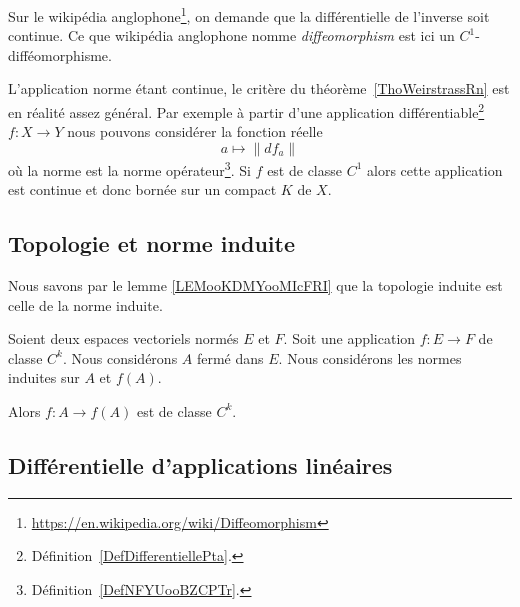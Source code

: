 \begin{normaltext}
	Sur le wikipédia anglophone\footnote{\url{https://en.wikipedia.org/wiki/Diffeomorphism}}, on demande que la différentielle de l'inverse soit continue. Ce que wikipédia anglophone nomme \emph{diffeomorphism} est ici un \( C^1\)-difféomorphisme.
\end{normaltext}

\begin{remark}      \label{RemATQVooDnZBbs}
	L'application norme étant continue, le critère du théorème~\ref{ThoWeirstrassRn} est en réalité assez général. Par exemple à partir d'une application différentiable\footnote{Définition~\ref{DefDifferentiellePta}.} \( f\colon X\to Y\)  nous pouvons considérer la fonction réelle
	\begin{equation}
		a\mapsto \|  df_a   \|
	\end{equation}
	où la norme est la norme opérateur\footnote{Définition~\ref{DefNFYUooBZCPTr}.}. Si \( f\) est de classe \( C^1\) alors cette application est continue et donc bornée sur un compact \( K\) de \( X\).
\end{remark}


\subsection{Topologie et norme induite}

Nous savons par le lemme \ref{LEMooKDMYooMIcFRI} que la topologie induite est celle de la norme induite.

\begin{proposition}	\label{PROPooORVKooIfIqVL}
	Soient deux espaces vectoriels normés \( E\) et \( F\). Soit une application \(f \colon E\to F  \) de classe \( C^k\). Nous considérons \( A\) fermé dans \( E\). Nous considérons les normes induites sur \( A\) et \( f(A)\).

	Alors \(f \colon A\to f(A)  \) est de classe \( C^k\).
\end{proposition}



\subsection{Différentielle d'applications linéaires}

